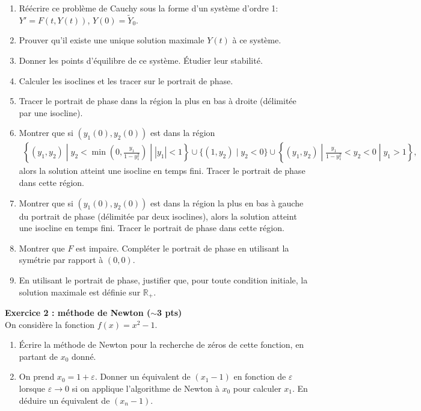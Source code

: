 \documentclass[11pt,a4paper]{article}
\newcommand{\R}{\mathbb R}
\begin{document}
\begin{enumerate}
\item R\'e\'ecrire ce probl\`eme de Cauchy sous la forme d'un syst\`eme d'ordre 1:
  $Y' = F(t,Y(t))$, $Y(0) = \tilde{Y}_0$.
\item Prouver qu'il existe une unique solution maximale $Y(t)$ \`a ce syst\`eme.
\item Donner les points d'\'equilibre de ce syst\`eme. \'Etudier leur stabilit\'e.
\item Calculer les isoclines et les tracer sur le portrait de phase.
\item Tracer le portrait de phase dans la r\'egion la plus en bas \`a droite
  (d\'elimit\'ee par une isocline).
\item Montrer que si $(y_1(0),y_2(0))$ est dans la r\'egion
  \begin{align*}
    \left\{ (y_1,y_2) \; | \; y_2 < \min \left(0 , \frac{y_1}{1-y_1^2} \right)
    \; | \; | y_1 | < 1 \right\} \cup
    \Big\{ (1,y_2) \; | \; y_2 < 0 \Big\} \cup
    \left\{ (y_1,y_2) \; | \; \frac{y_1}{1-y_1^2} < y_2 < 0 \; | \; y_1 > 1 \right\} ,
  \end{align*}
  alors la solution atteint une isocline en temps fini.
  Tracer le portrait de phase dans cette r\'egion.

\item Montrer que si $(y_1(0),y_2(0))$ est dans la r\'egion la plus en bas \`a gauche
  du portrait de phase (d\'elimit\'ee par deux isoclines),
  alors la solution atteint une isocline en temps fini.
  Tracer le portrait de phase dans cette r\'egion.
\item Montrer que $F$ est impaire. Compl\'eter le portrait de phase
  en utilisant la sym\'etrie par rapport \`a $(0,0)$.
\item En utilisant le portrait de phase, justifier que, pour toute condition initiale,
  la solution maximale est d\'efinie sur $\R_+$.
\end{enumerate}

{\bf Exercice 2 : m\'ethode de Newton ($\sim$3 pts)} \vspace{0.1cm}\\
On considère la fonction $f(x) = x^2-1$.

\begin{enumerate}
\item Écrire la méthode de Newton pour la recherche de zéros de cette fonction, en partant de $x_0$ donné.

\item On prend $x_0=1+\varepsilon$. Donner un équivalent de $(x_1-1)$ en fonction de $\varepsilon$ lorsque $\varepsilon \to 0$ si on applique l'algorithme de Newton à $x_0$ pour calculer $x_1$. En déduire un équivalent de $(x_n-1)$.
\end{enumerate}
\end{document}

